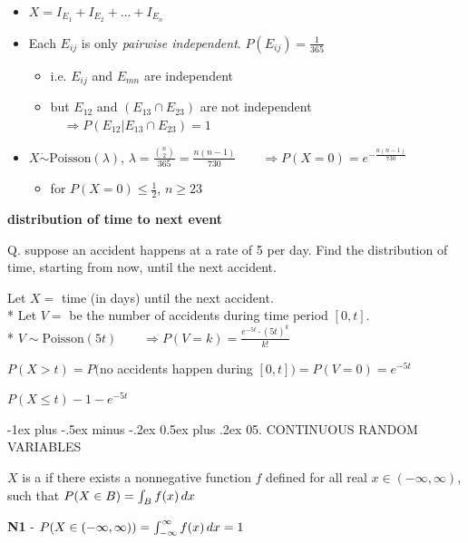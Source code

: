 \documentclass[10pt, landscape]{article}
\makeatletter
\renewcommand{\section}{\@startsection{section}{1}{0mm}%
  {-1ex plus -.5ex minus -.2ex}%
  {0.5ex plus .2ex}%
{\normalfont\large\bfseries}}
\makeatother
\begin{document}
\begin{multicols*}{3}
  \begin{itemize}
    \item $X = I_{E_1} + I_{E_2} + \dots + I_{E_n}$
    \item Each $E_{ij}$ is only \textit{pairwise independent}. $P(E_{ij}) = \frac{1}{365}$
      \begin{itemize}
        \item i.e. $E_{ij}$ and $E_{mn}$ are independent
        \item but $E_{12}$ and $(E_{13} \cap E_{23})$ are not independent $\quad \Rightarrow P(E_{12} \vert E_{13} \cap E_{23}) = 1$
      \end{itemize}
    \item $X \dot\sim \text{Poisson}(\lambda)$, $\lambda = \frac{\binom{n}{2}}{365} = \frac{n(n-1)}{730} \quad\quad \Rightarrow P(X=0) = e^{- \frac{n(n-1)}{730} } $ 
      \begin{itemize}
        \item for $P(X=0) \leq \frac{1}{2}$, $n \geq 23$
      \end{itemize}
  \end{itemize}

  \textbf{distribution of time to next event}

  Q. suppose an accident happens at a rate of 5 per day. Find the distribution of time, starting from now, until the next accident.

  \begin{niceproof}[A]
    Let $X =$ time (in days) until the next accident.
    \\* Let $V =$ be the number of accidents during time period $[0, t]$. 
    \\* $V \sim \text{Poisson}(5t) \quad \quad \Rightarrow P(V=k) = \frac{e^{-5t} \cdot (5t)^k}{k!} $

    $P(X > t) = P($no accidents happen during $[0, t]) = P(V=0) = e^{-5t}$

    $P(X \leq t) - 1-e^{-5t}$
  \end{niceproof}


  \section{05. CONTINUOUS RANDOM VARIABLES}

  $X$ is a  if there exists a nonnegative function $f$ defined for all real $x \in (-\infty, \infty)$, 
  such that $P(X \in B) = \int_B f(x) \mathop{dx}$ 

  \begin{minipage}[c]{0.6\linewidth}
    \textbf{N1} - $P(X \in (-\infty, \infty)) = \int^\infty_{-\infty} f(x) \mathop{dx} = 1 $


\end{minipage}
\end{multicols*}
\end{document}
